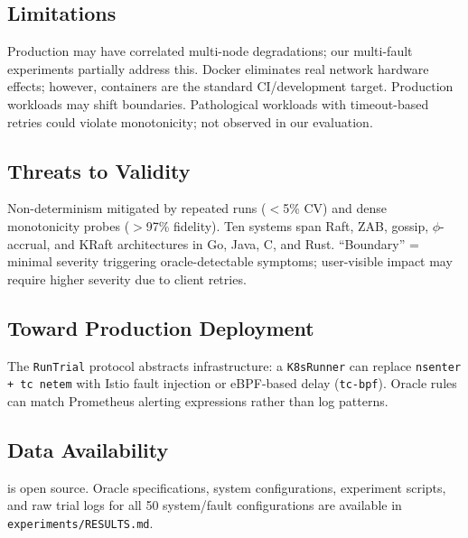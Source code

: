 \subsection{Limitations}
\label{sec:limitations}

 Production may have correlated multi-node
degradations; our multi-fault experiments partially address this.
 Docker eliminates real network hardware
effects; however, containers are the standard CI/development target.
 Production workloads may shift boundaries.
 Pathological workloads with timeout-based retries could
violate monotonicity; not observed in our evaluation.

\subsection{Threats to Validity}
\label{sec:threats}

 Non-determinism mitigated by repeated runs ($<$5\% CV)
and dense monotonicity probes ($>$97\% fidelity).
 Ten systems span Raft, ZAB, gossip, $\phi$-accrual, and
KRaft architectures in Go, Java, C, and Rust.  ``Boundary''
= minimal severity triggering oracle-detectable symptoms; user-visible
impact may require higher severity due to client retries.

\subsection{Toward Production Deployment}
\label{sec:production}

The \texttt{RunTrial} protocol abstracts infrastructure: a
\texttt{K8sRunner} can replace \texttt{nsenter + tc netem} with Istio
fault injection or eBPF-based delay (\texttt{tc-bpf}). Oracle rules can
match Prometheus alerting expressions rather than log patterns.

\subsection{Data Availability}

\system{} is open source. Oracle specifications, system configurations,
experiment scripts, and raw trial logs for all 50 system/fault
configurations are available in \texttt{experiments/RESULTS.md}.
